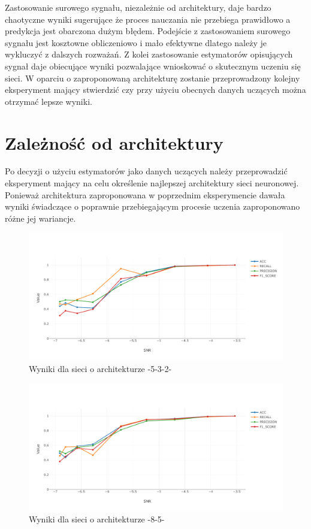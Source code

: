 \documentclass[inzynierska]{pwr_wmat_praca_dyplomowa}
\theoremstyle{plain}
\numberwithin{theorem}{chapter}
\theoremstyle{definition}
\numberwithin{theorem}{chapter}
\begin{document}
Zastosowanie surowego sygnału, niezależnie od architektury, daje bardzo chaotyczne wyniki sugerujące że proces nauczania nie przebiega prawidłowo a predykcja jest obarczona dużym błędem. Podejście z zastosowaniem surowego sygnału jest kosztowne obliczeniowo i mało efektywne dlatego należy je wykluczyć z dalszych rozważań. Z kolei zastosowanie estymatorów opisujących sygnał daje obiecujące wyniki pozwalające wnioskować o skutecznym uczeniu się sieci. W oparciu o zaproponowaną architekturę zostanie przeprowadzony kolejny eksperyment mający stwierdzić czy przy użyciu obecnych danych uczących można otrzymać lepsze wyniki.

\section{Zależność od architektury}
Po decyzji o użyciu estymatorów jako danych uczących należy przeprowadzić eksperyment mający na celu określenie najlepszej architektury sieci neuronowej. Ponieważ architektura zaproponowana w poprzednim eksperymencie dawała wyniki świadczące o poprawnie przebiegającym procesie uczenia zaproponowano różne jej wariancje. 
\begin{figure}[ht]
	\centering
	\includegraphics[width=14cm]{images/nn_small_532.pdf}
	\caption{Wyniki dla sieci o architekturze -5-3-2-}
	\label{wynik2-est-5-3-2}
\end{figure}
\begin{figure}[ht]
	\centering
	\includegraphics[width=14cm]{images/nn_small_85.pdf}
	\caption{Wyniki dla sieci o architekturze -8-5-}
	\label{wynik-est-8-5}
\end{figure}
\end{document}
